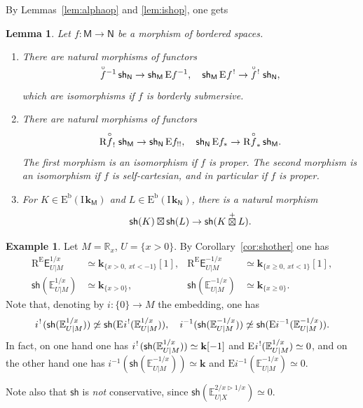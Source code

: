 \documentclass[11pt]{article}
\numberwithin{equation}{section}
\newenvironment{enumeratei}
{\bgroup\def\theenumi{\roman{enumi}}\def\theenumii{\alph{enumii}}\begin{enumerate}}
{\end{enumerate}\egroup}
\newcommand{\accentset}[2]{\overset{#1}{#2}}
\theoremstyle{plain}
\newtheorem{lemma}[theorem]{Lemma}
\theoremstyle{definition}
\newtheorem{example}[theorem]{Example}
\newcommand{\R}{\mathbb{R}}
\newcommand{\derived}[1]{\mathrm{#1}}
\newcommand{\dere}{\derived{E}}\let\enh\dere
\newcommand{\derr}{\derived{R}}
\newcommand{\BEC}[2][\ifield]{\dere^{\mathrm{b}}(#1_{#2})}
\newcommand{\roim}[1]{\derr#1_*}
\newcommand{\reim}[1]{\derr#1_{\mspace{.5mu}!}\mspace{2mu}}
\newcommand{\epb}[1]{#1^{\mspace{1.5mu}!}\mspace{2mu}}
\newcommand{\etens}[1][]{\mathbin{\boxtimes_{\raise1.5ex\hbox to-.1em{}#1}}}
\newcommand{\RE}{\operatorname{R^\enh}}
\newcommand{\Eopb}[1]{\enh#1^{-1}}
\newcommand{\Eoim}[1]{\enh#1_*}
\newcommand{\Eeeim}[1]{\enh#1_{!!}}
\newcommand{\Eepb}[1]{\enh\mspace{1mu}#1^{\mspace{1.5mu}!}}
\newcommand{\field}{\mathbf{k}}\let\cor\field
\newcommand{\ind}{\mathrm{I}\mspace{2mu}}
\newcommand{\ifield}{\ind\field}
\newcommand{\unbordered}[1]{{\accentset{\circ}{#1}}}
\let\oo \unbordered
\newcommand{\cetens}{\mathbin{\mathop\boxtimes\limits^+}}
\newcommand{\range}[2]{#1 \mathbin{\rhd} #2}
\newcommand{\ex}{\mathsf{E}}\let\exx\ex
\newcommand{\sh}{\mathsf{sh}}
\newcommand{\bbM}{\mathsf{M}}
\newcommand{\bbN}{\mathsf{N}}
\newcommand{\Ex}{\mathbb{E}}
\newcommand{\st}[1]{{\{{#1}\}}}
\newcommand{\opb}[1]{#1^{-1}}
\begin{document}
By Lemmas~\ref{lem:alphaop} and \ref{lem:ishop}, one gets

\begin{lemma}\label{lem:shop}
Let $f\colon \bbM\to \bbN$ be a morphism of bordered spaces.
\begin{enumeratei}
\item\label{lem:shopi}
There are natural morphisms of functors
\[
\opb {\smash{\oo f}} \, \sh_{\bbN} \to \sh_{\bbM} \, \Eopb f, \quad
\sh_{\bbM} \, \Eepb f \to \epb {\smash{\oo f}} \, \sh_{\bbN},
\]
which are isomorphisms if $f$ is borderly submersive.
\item\label{lem:shopii}
There are natural morphisms of functors
\[
\reim{\oo f} \, \sh_{\bbM} \to \sh_{\bbN} \, \Eeeim f, \quad
\sh_{\bbN} \, \Eoim f \to \roim{\oo f} \, \sh_{\bbM}.
\]
The first morphism is an isomorphism if $f$ is proper.
The second morphism is an isomorphism if $f$ is self-cartesian,
and in particular if $f$ is proper.
\item\label{lem:shopiii}
For $K\in\BEC\bbM$ and $L\in\BEC\bbN$,
there is a natural morphism
\[
\sh(K)\etens\sh(L)\to\sh(K\cetens L).
\]
\end{enumeratei}
\end{lemma}

\begin{example}\label{exam:310}
Let $M=\R_x$, $U=\st{x>0}$.
By Corollary~\ref{cor:shother} one has
\begin{align*}
\RE\ex^{1/x}_{U|M} &\simeq \field_{\st{x>0,\ xt<-1}}[1], &
\RE\ex^{-1/x}_{U|M} &\simeq \field_{\st{x\geq0,\ xt<1}}[1], \\
\sh(\Ex^{1/x}_{U|M}) &\simeq \field_{\st{x>0}}, &
\sh(\Ex^{-1/x}_{U|M}) &\simeq \field_{\st{x\geq0}}.
\end{align*}
Note that, denoting by $i\colon\st0\to M$ the embedding, one has
\[
\epb i (\sh (\Ex^{1/x}_{U|M})) \not\simeq \sh (\Eepb i (\Ex^{1/x}_{U|M})), \quad
\opb i (\sh (\Ex^{-1/x}_{U|M})) \not\simeq \sh (\Eopb i (\Ex^{-1/x}_{U|M})).
\]
In fact, on one hand one has $\epb i (\sh (\Ex^{1/x}_{U|M}))\simeq\field[-1]$ and $\Eepb i (\Ex^{1/x}_{U|M})\simeq 0$, and on the other hand one has $\opb i (\sh (\Ex^{-1/x}_{U|M}))\simeq\field$ and $\Eopb i (\Ex^{-1/x}_{U|M})\simeq0$.

Note also that $\sh$ is \emph{not} conservative, since $\sh(\Ex_{U|X}^{\range{2/x}{1/x}})\simeq 0$.
\end{example}
\end{document}
